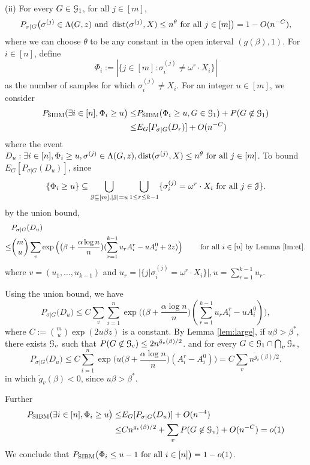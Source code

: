 \documentclass{article}
\begin{document}
\noindent (ii) For every $G\in\mathcal{G}_{1}$, for all $j\in[m]$,
\begin{equation}  \label{eq:chui}
P_{\sigma|G} \big( \sigma^{(j)}\in  \Lambda(G, z)
\text{~and~} \operatorname{dist}(\sigma^{(j)}, X) \le n^\theta
\text{~for all~} j\in[m]  \big)
=1- O(n^{-C}) ,
\end{equation}
where we can choose $\theta$ to be any constant in the open interval $(g(\beta), 1)$.
For $i\in[n]$, define 
$$
\Phi_i := |\{j\in[m]: \sigma_i^{(j)} \neq \omega^r \cdot X_i\}|
$$
as the number of samples for which $\sigma_i^{(j)} \neq X_i$.
For an integer $u\in[m]$, we consider
\begin{align*}
P_{\operatorname{SIBM}}( \exists i \in [n], \Phi_i \ge u \big) \leq &P_{\operatorname{SIBM}}( \Phi_i \ge u , G \in \mathcal{G}_{1}) + P(G \not\in \mathcal{G}_{1}) \\
\leq & E_G[P_{\sigma |G}(D_r)]+ O(n^{-C})
\end{align*}
where the event $D_u: \exists i \in [n], \Phi_i \ge u, \sigma^{(j)}\in \Lambda(G,z) ,\operatorname{dist}(\sigma^{(j)}, X) \le n^{\theta} \text{~for all~} j\in[m]$.
To bound  $E_G[P_{\sigma |G}(D_u)]$,
since
$$
\{\Phi_i \ge u\} \subseteq
\bigcup_{\mathcal{J}\subseteq[m], |\mathcal{J}|=u}\bigcup_{1\leq r \leq k-1}
\{\sigma_i^{(j)} = \omega^r \cdot X_i \text{~for all~} j\in \mathcal{J}\} .
$$
by the union bound,
\begin{align*}
& P_{\sigma|G}(D_u) \\
\le &  \binom{m}{u}\sum_v \exp\Big(\big(\beta+\frac{\alpha\log n}{n} \big) (\sum_{r=1}^{k-1} u_r A^r_i- u A^0_i + 2z) \Big)
\quad\quad\text{~for all~} i\in[n] \textrm{ by Lemma~\ref{lm:et}}.
\end{align*}
where $v=(u_1, \dots, u_{k-1})$ and $u_r = |\{j | \sigma_i^{(j)} = \omega^r \cdot X_i \}|, u=\sum_{r=1}^{k-1} u_r$.

Using the union bound, we have
$$
P_{\sigma|G} \big(D_u\big) \le 
C  \sum_{v}\sum_{i=1}^n \exp\Big(\big(\beta+\frac{\alpha\log n}{n} \big) (\sum_{r=1}^{k-1} u_r A^r_i- u A^0_i ) \Big),
$$
where $C:=\binom{m}{u}\exp(2u\beta z)$ is a constant.
By Lemma \ref{lem:large}, if $u\beta>\beta^*$, there exists $\mathcal{G}_v$ such that $P(G\not\in\mathcal{G}_v) \leq 2n^{\tilde{g}_v(\beta)/2}$.
and for every $G\in\mathcal{G}_1 \cap \bigcap_{v}\mathcal{G}_{v}$,
$$
P_{\sigma|G} \big(D_u\big) \le 
C\sum_{i=1}^n \exp\Big(u \big(\beta+\frac{\alpha\log n}{n} \big) (A^r_i-A^0_i ) \Big) = C\sum_{v} n^{\tilde{g}_v(\beta)/2}.
$$
in which $\tilde{g}_v(\beta) < 0$, since $u\beta > \beta^*$.

Further
\begin{align*}
P_{\operatorname{SIBM}}( \exists i \in [n], \Phi_i \ge u \big)
\leq & E_G[P_{\sigma |G}(D_u)] + O(n^{-4}) \\
\leq &  Cn^{g_v(\beta)/2} + \sum_{v} P(G \not\in \mathcal{G}_v) + O(n^{-C}) = o(1)
\end{align*}
We conclude that $P_{\operatorname{SIBM}} \big(\Phi_i \le u-1 \text{~for all~} i\in[n] \big)=1-o(1)$.
\end{document}

